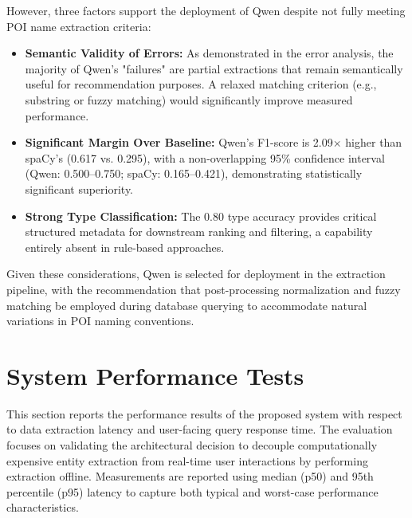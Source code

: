 \documentclass[a4paper,12pt]{report}
\begin{document}
However, three factors support the deployment of Qwen despite not fully meeting POI name extraction criteria:
\begin{itemize}
\item \textbf{Semantic Validity of Errors:} As demonstrated in the error analysis, the majority of Qwen's "failures" are partial extractions that remain semantically useful for recommendation purposes. A relaxed matching criterion (e.g., substring or fuzzy matching) would significantly improve measured performance.
\item \textbf{Significant Margin Over Baseline:} Qwen's F1-score is 2.09× higher than spaCy's (0.617 vs. 0.295), with a non-overlapping 95\% confidence interval (Qwen: 0.500–0.750; spaCy: 0.165–0.421), demonstrating statistically significant superiority.
\item \textbf{Strong Type Classification:} The 0.80 type accuracy provides critical structured metadata for downstream ranking and filtering, a capability entirely absent in rule-based approaches.
\end{itemize}

Given these considerations, Qwen is selected for deployment in the extraction pipeline, with the recommendation that post-processing normalization and fuzzy matching be employed during database querying to accommodate natural variations in POI naming conventions.

\section{System Performance Tests}

This section reports the performance results of the proposed system with respect to data extraction latency and user-facing query response time. The evaluation focuses on validating the architectural decision to decouple computationally expensive entity extraction from real-time user interactions by performing extraction offline. Measurements are reported using median (p50) and 95th percentile (p95) latency to capture both typical and worst-case performance characteristics.
\end{document}
